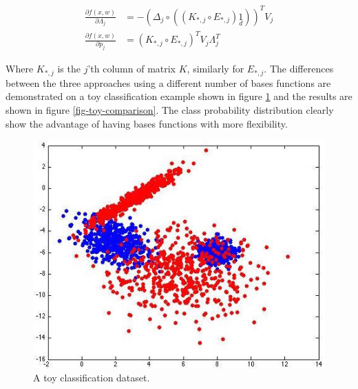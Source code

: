 \documentclass[useAMS,usenatbib,fleqn]{mn2e}
\begin{document}
\begin{subequations}
\begin{align} 
\label{eq-dfdL}
\frac{\partial f(x,w)}{\partial \Lambda_{j}} &= -\left( \Delta_{j}\circ \left(\left(K_{*,j}\circ E_{*,j}\right)\underset{d}{1}\right) \right)^{T}V_{j}\\
\label{eq-dfdP}
\frac{\partial f(x,w)}{\partial p_{j}} &= \left( K_{*,j}\circ E_{*,j} \right)^{T}V_{j}\Lambda_{j}^{T}
\end{align}
\end{subequations}

Where $K_{*,j}$ is the $j$'th column of matrix $K$, similarly for $E_{*,j}$. The differences between the three approaches using a different number of bases functions are demonstrated on a toy classification example shown in figure \ref{fig-toy-example} and the results are shown in figure \ref{fig-toy-comparison}. The class probability distribution clearly show the advantage of having bases functions with more flexibility. 

\begin{figure}
       \centering
       \includegraphics[trim = 25px 12px 10px 10px, clip=true,width=\columnwidth]{clouds.jpg}
        \caption{A toy classification dataset. }       
       \label{fig-toy-example}
\end{figure}
\end{document}

